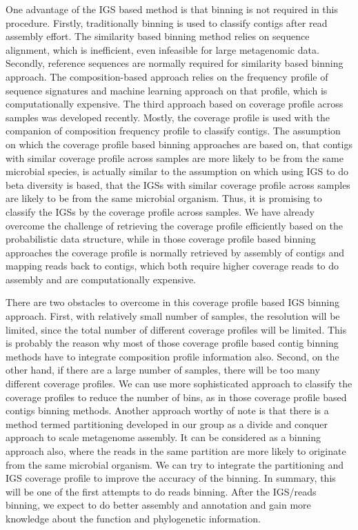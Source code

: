 One advantage of the IGS based method is that binning is not required in this
procedure. Firstly, traditionally binning is used to classify contigs after read
assembly effort. The similarity based binning method relies on
sequence alignment, which is inefficient, even infeasible for large
metagenomic data. Secondly, reference sequences are normally required for
similarity based binning approach. The composition-based approach relies on the
frequency profile of sequence signatures and machine learning approach on that
profile, which is computationally expensive. 
The third approach based on coverage profile across samples was developed
recently.\cite{Imelfort2014}\cite{Alneberg2014} Mostly, the coverage
profile is used with the companion of composition frequency profile to classify
contigs. The assumption on which the coverage profile based binning approaches
are based on, that contigs with similar coverage profile across samples are
more likely to be from the same microbial species, is actually similar to the
assumption on which using IGS to do beta diversity is based, that the IGSs with
similar coverage profile across samples are likely to be from the same
microbial organism. Thus, it is promising to classify the IGSs by the coverage
profile across samples. We have already overcome the challenge of retrieving the
coverage profile efficiently based on the probabilistic data structure, while
in those coverage profile based binning approaches the coverage profile is 
normally retrieved by assembly of contigs and mapping
reads back to contigs, which both require higher coverage reads to do assembly
and are computationally expensive. 

There are two obstacles to overcome in this coverage profile based
IGS binning approach. First, with relatively small number of samples, the
resolution will be limited, since the total number of different coverage
profiles will be limited. This is probably the reason why most of those coverage
profile based contig binning methods have to integrate composition profile information
also. Second, on the other hand, if there are a large number of samples, there
will be too many different coverage profiles. We can use more sophisticated
 approach to classify the coverage profiles to reduce the number of bins,
as in those coverage profile based contigs binning methods. Another approach
worthy of note is that there is a method termed partitioning developed in
our group as a divide and conquer approach to scale metagenome assembly. It can be 
considered as a binning approach also, where the reads in the same
partition are more likely to originate from the same microbial organism. We can
try to integrate the partitioning and IGS coverage profile to improve the
accuracy of the binning. In summary, this will be one of the first attempts to
do reads binning. After the IGS/reads binning,  we expect to do better assembly
 and annotation and gain more knowledge about the
function and phylogenetic information.  

